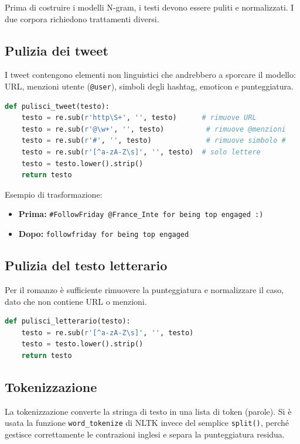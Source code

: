 \documentclass[12pt, a4paper]{article}
\begin{document}
Prima di costruire i modelli N-gram, i testi devono essere puliti
e normalizzati. I due corpora richiedono trattamenti diversi.

\subsection{Pulizia dei tweet}

I tweet contengono elementi non linguistici che andrebbero a
sporcare il modello: URL, menzioni utente (\texttt{@user}),
simboli degli hashtag, emoticon e punteggiatura.

\begin{lstlisting}[language=Python, caption=Funzione di pulizia dei tweet]
def pulisci_tweet(testo):
    testo = re.sub(r'http\S+', '', testo)      # rimuove URL
    testo = re.sub(r'@\w+', '', testo)          # rimuove @menzioni
    testo = re.sub(r'#', '', testo)             # rimuove simbolo #
    testo = re.sub(r'[^a-zA-Z\s]', '', testo)  # solo lettere
    testo = testo.lower().strip()
    return testo
\end{lstlisting}

Esempio di trasformazione:
\begin{itemize}[leftmargin=1.5cm]
    \item \textbf{Prima:} \texttt{\#FollowFriday @France\_Inte for being top engaged :)}
    \item \textbf{Dopo:}  \texttt{followfriday for being top engaged}
\end{itemize}

\subsection{Pulizia del testo letterario}

Per il romanzo è sufficiente rimuovere la punteggiatura e normalizzare
il caso, dato che non contiene URL o menzioni.

\begin{lstlisting}[language=Python, caption=Funzione di pulizia del testo letterario]
def pulisci_letterario(testo):
    testo = re.sub(r'[^a-zA-Z\s]', '', testo)
    testo = testo.lower().strip()
    return testo
\end{lstlisting}

\subsection{Tokenizzazione}

La tokenizzazione converte la stringa di testo in una lista di token
(parole). Si è usata la funzione \texttt{word\_tokenize} di NLTK
invece del semplice \texttt{split()}, perché gestisce correttamente
le contrazioni inglesi e separa la punteggiatura residua.
\end{document}
